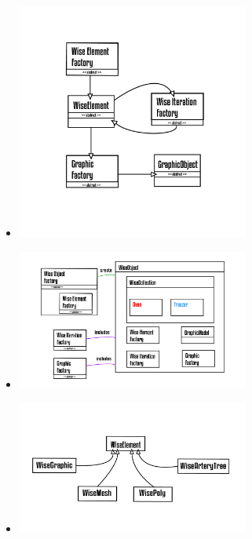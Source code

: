 \documentclass[10pt]{beamer}
\theoremstyle{remark}
\theoremstyle{definition}
\begin{document}
\begin{frame}[allowframebreaks]
	\framebreak
	\begin{itemize}
		
		\item \includegraphics[width=0.6\textwidth]{images/Prancheta 11@4x.png}
		
	\end{itemize}

	\framebreak
	\begin{itemize}
	
	\item \includegraphics[width=0.6\textwidth]{images/Prancheta 13_1@4x.png}
	
	\end{itemize}

	\framebreak
	\begin{itemize}
	
	\item \includegraphics[width=0.6\textwidth]{images/Prancheta 13@4x.png}
	

\end{itemize}
\end{frame}
\end{document}
